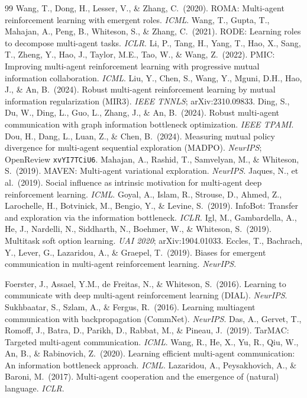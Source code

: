 \documentclass[10pt, letterpaper]{article}
\begin{document}
\begin{thebibliography}{99}
 Wang, T., Dong, H., Lesser, V., \& Zhang, C.\ (2020). ROMA: Multi-agent reinforcement learning with emergent roles. \emph{ICML}.
 Wang, T., Gupta, T., Mahajan, A., Peng, B., Whiteson, S., \& Zhang, C.\ (2021). RODE: Learning roles to decompose multi-agent tasks. \emph{ICLR}.
 Li, P., Tang, H., Yang, T., Hao, X., Sang, T., Zheng, Y., Hao, J., Taylor, M.E., Tao, W., \& Wang, Z.\ (2022). PMIC: Improving multi-agent reinforcement learning with progressive mutual information collaboration. \emph{ICML}.
 Liu, Y., Chen, S., Wang, Y., Mguni, D.H., Hao, J., \& An, B.\ (2024). Robust multi-agent reinforcement learning by mutual information regularization (MIR3). \emph{IEEE TNNLS}; arXiv:2310.09833.
 Ding, S., Du, W., Ding, L., Guo, L., Zhang, J., \& An, B.\ (2024). Robust multi-agent communication with graph information bottleneck optimization. \emph{IEEE TPAMI}.
 Dou, H., Dang, L., Luan, Z., \& Chen, B.\ (2024). Measuring mutual policy divergence for multi-agent sequential exploration (MADPO). \emph{NeurIPS}; OpenReview \texttt{xvYI7TCiU6}.
 Mahajan, A., Rashid, T., Samvelyan, M., \& Whiteson, S.\ (2019). MAVEN: Multi-agent variational exploration. \emph{NeurIPS}.
 Jaques, N., et al.\ (2019). Social influence as intrinsic motivation for multi-agent deep reinforcement learning. \emph{ICML}.
 Goyal, A., Islam, R., Strouse, D., Ahmed, Z., Larochelle, H., Botvinick, M., Bengio, Y., \& Levine, S.\ (2019). InfoBot: Transfer and exploration via the information bottleneck. \emph{ICLR}.
 Igl, M., Gambardella, A., He, J., Nardelli, N., Siddharth, N., Boehmer, W., \& Whiteson, S.\ (2019). Multitask soft option learning. \emph{UAI 2020}; arXiv:1904.01033.
 Eccles, T., Bachrach, Y., Lever, G., Lazaridou, A., \& Graepel, T.\ (2019). Biases for emergent communication in multi-agent reinforcement learning. \emph{NeurIPS}.

 Foerster, J., Assael, Y.M., de Freitas, N., \& Whiteson, S.\ (2016). Learning to communicate with deep multi-agent reinforcement learning (DIAL). \emph{NeurIPS}.
 Sukhbaatar, S., Szlam, A., \& Fergus, R.\ (2016). Learning multiagent communication with backpropagation (CommNet). \emph{NeurIPS}.
 Das, A., Gervet, T., Romoff, J., Batra, D., Parikh, D., Rabbat, M., \& Pineau, J.\ (2019). TarMAC: Targeted multi-agent communication. \emph{ICML}.
 Wang, R., He, X., Yu, R., Qiu, W., An, B., \& Rabinovich, Z.\ (2020). Learning efficient multi-agent communication: An information bottleneck approach. \emph{ICML}.
 Lazaridou, A., Peysakhovich, A., \& Baroni, M.\ (2017). Multi-agent cooperation and the emergence of (natural) language. \emph{ICLR}.


\end{thebibliography}
\end{document}
